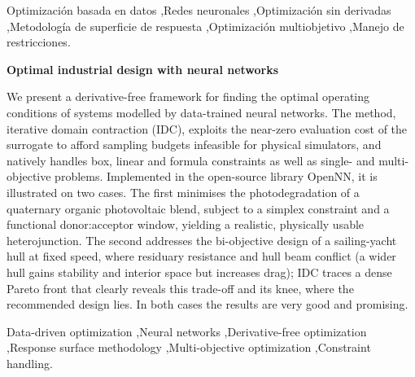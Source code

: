 \documentclass[5p,times,authoryear]{sciarticle}
\begin{document}
\begin{frontmatter}
\begin{keyword}
Optimización basada en datos \sep Redes neuronales \sep Optimización sin
derivadas \sep Metodología de superficie de respuesta \sep Optimización
multiobjetivo \sep Manejo de restricciones.
\end{keyword}

\begin{englishtitle}
\noindent \textbf{Optimal industrial design with neural networks}
\end{englishtitle}

\begin{abstractIng}
We present a derivative-free framework for finding the optimal operating
conditions of systems modelled by data-trained neural networks. The
method, iterative domain contraction (IDC), exploits the near-zero
evaluation cost of the surrogate to afford sampling budgets infeasible
for physical simulators, and natively handles box, linear and formula
constraints as well as single- and multi-objective problems. Implemented
in the open-source library OpenNN, it is illustrated on two cases. The
first minimises the photodegradation of a quaternary organic photovoltaic
blend, subject to a simplex constraint and a functional donor:acceptor
window, yielding a realistic, physically usable heterojunction. The second
addresses the bi-objective design of a sailing-yacht hull at fixed speed,
where residuary resistance and hull beam conflict (a wider hull gains
stability and interior space but increases drag); IDC traces a dense
Pareto front that clearly reveals this trade-off and its knee, where the
recommended design lies. In both cases the results are very good and
promising.
\end{abstractIng}

\begin{keywordIng}
Data-driven optimization \sep Neural networks \sep Derivative-free
optimization \sep Response surface methodology \sep Multi-objective
optimization \sep Constraint handling.
\end{keywordIng}

\end{frontmatter}
\end{document}
